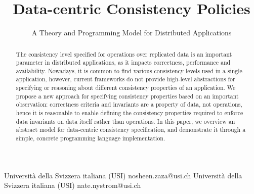 \documentclass[preprint, numbers]{sigplanconf}
\begin{document}
\setlength{\pdfpageheight}{\paperheight}
\setlength{\pdfpagewidth}{\paperwidth}




\title{Data-centric Consistency Policies}
\subtitle{A Theory and Programming Model for Distributed Applications}

           {Universit\`a della Svizzera italiana (USI)}
           {nosheen.zaza@usi.ch}
           {Universit\`a della Svizzera italiana (USI)}
           {nate.nystrom@usi.ch}

\maketitle

\begin{abstract}
The consistency level specified for operations over replicated data is 
an important parameter in distributed applications, as it impacts correctness, 
performance and availability. Nowadays, it is common to find various consistency
levels used in a single application, however, current frameworks do not
provide high-level abstractions for specifying or reasoning about different consistency properties of an application. 
We propose a new approach for specifying consistency properties based on an important observation: 
correctness criteria and invariants are a property of data, not operations, hence it is 
reasonable to enable defining the consistency properties required to enforce
data invariants on data itself rather than operations. In this paper, we overview an abstract model
for data-centric consistency specification, and demonstrate it through a simple,
concrete programming language implementation. \end{abstract}


\end{document}
